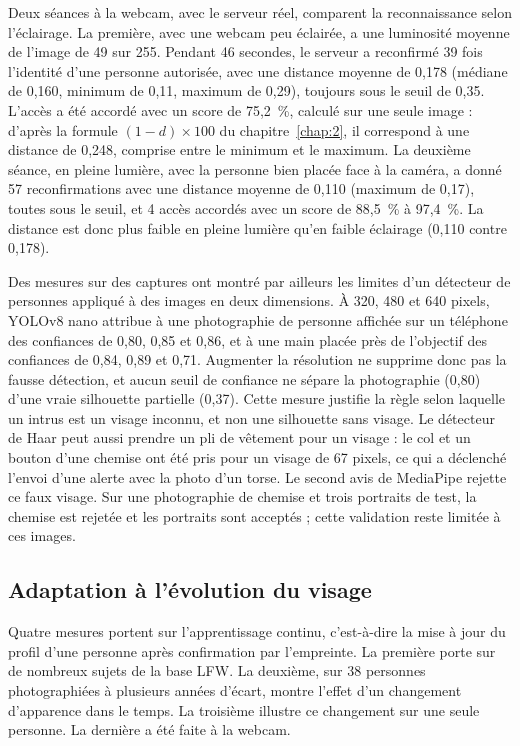 \begin{nouv}
Deux séances à la webcam, avec le serveur réel, comparent la reconnaissance selon l'éclairage. La première, avec une webcam peu éclairée, a une luminosité moyenne de l'image de 49 sur 255. Pendant 46 secondes, le serveur a reconfirmé 39 fois l'identité d'une personne autorisée, avec une distance moyenne de 0,178 (médiane de 0,160, minimum de 0,11, maximum de 0,29), toujours sous le seuil de 0,35. L'accès a été accordé avec un score de 75,2~\%, calculé sur une seule image : d'après la formule $(1-d)\times 100$ du chapitre~\ref{chap:2}, il correspond à une distance de 0,248, comprise entre le minimum et le maximum. La deuxième séance, en pleine lumière, avec la personne bien placée face à la caméra, a donné 57 reconfirmations avec une distance moyenne de 0,110 (maximum de 0,17), toutes sous le seuil, et 4 accès accordés avec un score de 88,5~\% à 97,4~\%. La distance est donc plus faible en pleine lumière qu'en faible éclairage (0,110 contre 0,178).

Des mesures sur des captures ont montré par ailleurs les limites d'un détecteur de personnes appliqué à des images en deux dimensions. À 320, 480 et 640 pixels, YOLOv8 nano attribue à une photographie de personne affichée sur un téléphone des confiances de 0,80, 0,85 et 0,86, et à une main placée près de l'objectif des confiances de 0,84, 0,89 et 0,71. Augmenter la résolution ne supprime donc pas la fausse détection, et aucun seuil de confiance ne sépare la photographie (0,80) d'une vraie silhouette partielle (0,37). Cette mesure justifie la règle selon laquelle un intrus est un visage inconnu, et non une silhouette sans visage. Le détecteur de Haar peut aussi prendre un pli de vêtement pour un visage : le col et un bouton d'une chemise ont été pris pour un visage de 67 pixels, ce qui a déclenché l'envoi d'une alerte avec la photo d'un torse. Le second avis de MediaPipe rejette ce faux visage. Sur une photographie de chemise et trois portraits de test, la chemise est rejetée et les portraits sont acceptés ; cette validation reste limitée à ces images.
\end{nouv}

\subsection{Adaptation à l'évolution du visage}

\begin{maj}
Quatre mesures portent sur l'apprentissage continu, c'est-à-dire la mise à jour du profil d'une personne après confirmation par l'empreinte. La première porte sur de nombreux sujets de la base LFW. La deuxième, sur 38 personnes photographiées à plusieurs années d'écart, montre l'effet d'un changement d'apparence dans le temps. La troisième illustre ce changement sur une seule personne. La dernière a été faite à la webcam.
\end{maj}

